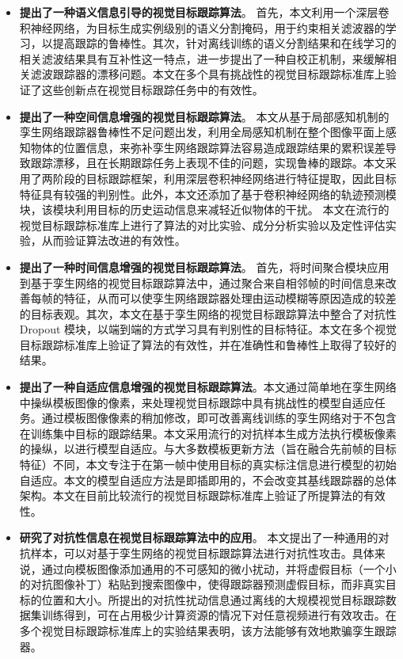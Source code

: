 \begin{itemize}
\item \textbf{提出了一种语义信息引导的视觉目标跟踪算法}。
首先，本文利用一个深层卷积神经网络，为目标生成实例级别的语义分割掩码，用于约束相关滤波器的学习，以提高跟踪的鲁棒性。其次，针对离线训练的语义分割结果和在线学习的相关滤波结果具有互补性这一特点，进一步提出了一种自校正机制，来缓解相关滤波跟踪器的漂移问题。本文在多个具有挑战性的视觉目标跟踪标准库上验证了这些创新点在视觉目标跟踪任务中的有效性。
\item \textbf{提出了一种空间信息增强的视觉目标跟踪算法}。
本文从基于局部感知机制的孪生网络跟踪器鲁棒性不足问题出发，利用全局感知机制在整个图像平面上感知物体的位置信息，来弥补孪生网络跟踪算法容易造成跟踪结果的累积误差导致跟踪漂移，且在长期跟踪任务上表现不佳的问题，实现鲁棒的跟踪。本文采用了两阶段的目标跟踪框架，利用深层卷积神经网络进行特征提取，因此目标特征具有较强的判别性。此外，本文还添加了基于卷积神经网络的轨迹预测模块，该模块利用目标的历史运动信息来减轻近似物体的干扰。
本文在流行的视觉目标跟踪标准库上进行了算法的对比实验、成分分析实验以及定性评估实验，从而验证算法改进的有效性。
\item \textbf{提出了一种时间信息增强的视觉目标跟踪算法}。
首先，将时间聚合模块应用到基于孪生网络的视觉目标跟踪算法中，通过聚合来自相邻帧的时间信息来改善每帧的特征，从而可以使孪生网络跟踪器处理由运动模糊等原因造成的较差的目标表观。其次，本文在基于孪生网络的视觉目标跟踪算法中整合了对抗性 Dropout 模块，以端到端的方式学习具有判别性的目标特征。本文在多个视觉目标跟踪标准库上验证了算法的有效性，并在准确性和鲁棒性上取得了较好的结果。
\item \textbf{提出了一种自适应信息增强的视觉目标跟踪算法}。本文通过简单地在孪生网络中操纵模板图像的像素，来处理视觉目标跟踪中具有挑战性的模型自适应任务。通过模板图像像素的稍加修改，即可改善离线训练的孪生网络对于不包含在训练集中目标的跟踪结果。本文采用流行的对抗样本生成方法执行模板像素的操纵，以进行模型自适应。与大多数模板更新方法（旨在融合先前帧的目标特征）不同，本文专注于在第一帧中使用目标的真实标注信息进行模型的初始自适应。本文的模型自适应方法是即插即用的，不会改变其基线跟踪器的总体架构。本文在目前比较流行的视觉目标跟踪标准库上验证了所提算法的有效性。
\item \textbf{研究了对抗性信息在视觉目标跟踪算法中的应用}。
本文提出了一种通用的对抗样本，可以对基于孪生网络的视觉目标跟踪算法进行对抗性攻击。具体来说，通过向模板图像添加通用的不可感知的微小扰动，并将虚假目标（一个小的对抗图像补丁）粘贴到搜索图像中，使得跟踪器预测虚假目标，而非真实目标的位置和大小。所提出的对抗性扰动信息通过离线的大规模视觉目标跟踪数据集训练得到，可在占用极少计算资源的情况下对任意视频进行有效攻击。在多个视觉目标跟踪标准库上的实验结果表明，该方法能够有效地欺骗孪生跟踪器。
\end{itemize}

